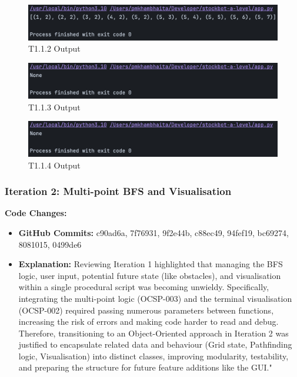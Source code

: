 \begin{figure}[htbp!]
    \centering
    \includegraphics[width=1\linewidth]{Images/t1.2.png}
    \caption{T1.1.2 Output}
    \label{fig:enter-label}
\end{figure}

\begin{figure}[htbp!]
    \centering
    \includegraphics[width=1\linewidth]{Images/t1.3,1.4.png}
    \caption{T1.1.3 Output}
    \label{fig:enter-label}
\end{figure}

\begin{figure}[htbp!]
    \centering
    \includegraphics[width=1\linewidth]{Images/t1.3,1.4.png}
    \caption{T1.1.4 Output}
    \label{fig:enter-label}
\end{figure}


\newpage

\subsubsection{Iteration 2: Multi-point BFS and Visualisation}

\textbf{Code Changes:}
\begin{itemize}
    \item \textbf{GitHub Commits:} c90ad6a, 7f76931, 9f2e44b, c88ec49, 94fef19, bc69274, 8081015, 0499de6
    \item \textbf{Explanation:}
    Reviewing Iteration 1 highlighted that managing the BFS logic, user input, potential future state (like obstacles), and visualisation within a single procedural script was becoming unwieldy. Specifically, integrating the multi-point logic (OCSP-003)  and the terminal visualisation (OCSP-002)  required passing numerous parameters between functions, increasing the risk of errors and making code harder to read and debug. Therefore, transitioning to an Object-Oriented approach in Iteration 2 was justified to encapsulate related data and behaviour (Grid state, Pathfinding logic, Visualisation) into distinct classes, improving modularity, testability, and preparing the structure for future feature additions like the GUI."
\end{itemize}

